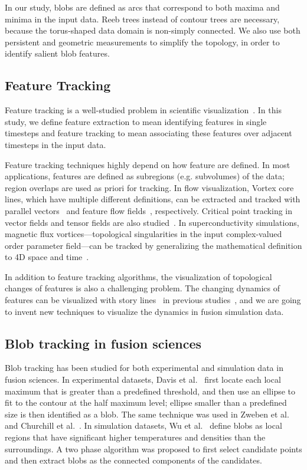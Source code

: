 In our study, blobs are defined as arcs that correspond to both maxima and minima in the input data.  Reeb trees instead of contour trees are necessary, because the torus-shaped data domain is non-simply connected.  We also use both persistent and geometric measurements to simplify the topology, in order to identify salient blob features.  


\subsection{Feature Tracking}

Feature tracking is a well-studied problem in scientific visualization~\cite{PostVHLD2003}.  In this study, we define feature extraction to mean identifying features in single timesteps and feature tracking to mean associating these features over adjacent timesteps in the input data.  

Feature tracking techniques highly depend on how feature are defined.  In most applications, features are defined as subregions (e.g. subvolumes) of the data; region overlaps are used as priori for tracking.  In flow visualization, Vortex core lines, which have multiple different definitions, can be extracted and tracked with parallel vectors~\cite{PeikertR99} and feature flow fields~\cite{TheiselS03, WeinkaufTGP11}, respectively.  Critical point tracking in vector fields and tensor fields are also studied~\cite{GarthTS04, TricocheSH01, TricocheWSH02, ReininghausKWH12}.  In superconductivity simulations, magnetic flux vortices---topological singularities in the input complex-valued order parameter field---can be tracked by generalizing the mathematical definition to 4D space and time~\cite{GuoPPKG16, GuoPG17, PhillipsGPKG16, PhillipsPKG15}.  

In addition to feature tracking algorithms, the visualization of topological changes of features is also a challenging problem.  The changing dynamics of features can be visualized with story lines~\cite{TanahashiM12} in previous studies~\cite{GuoPPKG16}, and we are going to invent new techniques to visualize the dynamics in fusion simulation data.  


\subsection{Blob tracking in fusion sciences}

Blob tracking has been studied for both experimental and simulation data in fusion sciences.  In experimental datasets, Davis et al.~\cite{DavisKMRSZ14} first locate each local maximum that is greater than a predefined threshold, and then use an ellipse to fit to the contour at the half maximum level; ellipse smaller than a predefined size is then identified as a blob.  The same technique was used in Zweben et al.~\cite{Zweben15} and Churchill et al.~\cite{Churchill17}.  In simulation datasets, Wu et al.~\cite{WuWSCCSCK16} define blobs as local regions that have significant higher temperatures and densities than the surroundings.  A two phase algorithm was proposed to first select candidate points and then extract blobs as the connected components of the candidates.  

